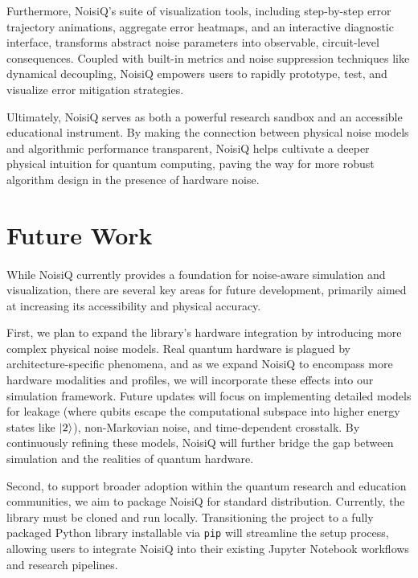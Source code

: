 \documentclass[10pt,twocolumn]{article}
\begin{document}
    Furthermore, NoisiQ's suite of visualization tools, including step-by-step error trajectory animations, aggregate error heatmaps, and an interactive diagnostic interface, 
transforms abstract noise parameters into observable, circuit-level consequences. 
Coupled with built-in metrics and noise suppression techniques like dynamical decoupling, NoisiQ empowers users to rapidly prototype, test, and visualize error mitigation strategies. 

    Ultimately, NoisiQ serves as both a powerful research sandbox and an accessible educational instrument. 
By making the connection between physical noise models and algorithmic performance transparent, NoisiQ helps cultivate a deeper physical intuition for quantum computing, 
paving the way for more robust algorithm design in the presence of hardware noise.

\section*{Future Work}
\label{sec:future_work}
\paragraph{}
    While NoisiQ currently provides a foundation for noise-aware simulation and visualization, there are several key areas for future development, primarily aimed at increasing its accessibility and physical accuracy.

    First, we plan to expand the library's hardware integration by introducing more complex physical noise models. 
Real quantum hardware is plagued by architecture-specific phenomena, and as we expand NoisiQ to encompass more hardware modalities and profiles, we will incorporate these effects into our simulation framework. 
Future updates will focus on implementing detailed models for leakage (where qubits escape the computational subspace into higher energy states like $\ket{2}$), non-Markovian noise, and time-dependent crosstalk. 
By continuously refining these models, NoisiQ will further bridge the gap between simulation and the realities of quantum hardware.

    Second, to support broader adoption within the quantum research and education communities, we aim to package NoisiQ for standard distribution. 
Currently, the library must be cloned and run locally. 
Transitioning the project to a fully packaged Python library installable via \texttt{pip} will streamline the setup process, 
allowing users to integrate NoisiQ into their existing Jupyter Notebook workflows and research pipelines.
\end{document}
